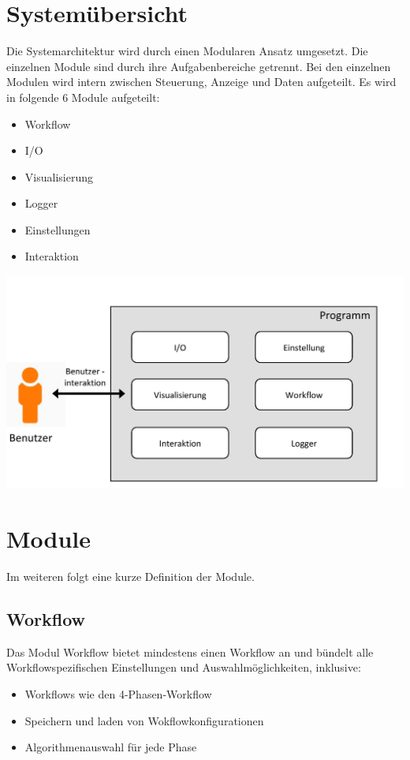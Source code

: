 \section{Systemübersicht}
Die Systemarchitektur wird durch einen Modularen Ansatz umgesetzt.
Die einzelnen Module sind durch ihre Aufgabenbereiche getrennt.
Bei den einzelnen Modulen wird intern zwischen Steuerung, Anzeige und Daten aufgeteilt.
Es wird in folgende 6 Module aufgeteilt:

\begin{itemize}
\item Workflow
\item I/O
\item Visualisierung
\item Logger
\item Einstellungen
\item Interaktion
\end{itemize}
\includegraphics[scale=0.35]{img/Uebersicht.jpg} 

\newpage 
\section{Module}
Im weiteren folgt eine kurze Definition der Module.

\subsection{Workflow}
Das Modul Workflow bietet mindestens einen Workflow an und bündelt alle Workflowspezifischen
Einstellungen und Auswahlmöglichkeiten, inklusive:

\begin{itemize}
\item Workflows wie den 4-Phasen-Workflow
\item Speichern und laden von Wokflowkonfigurationen
\item Algorithmenauswahl für jede Phase 
\end{itemize}

